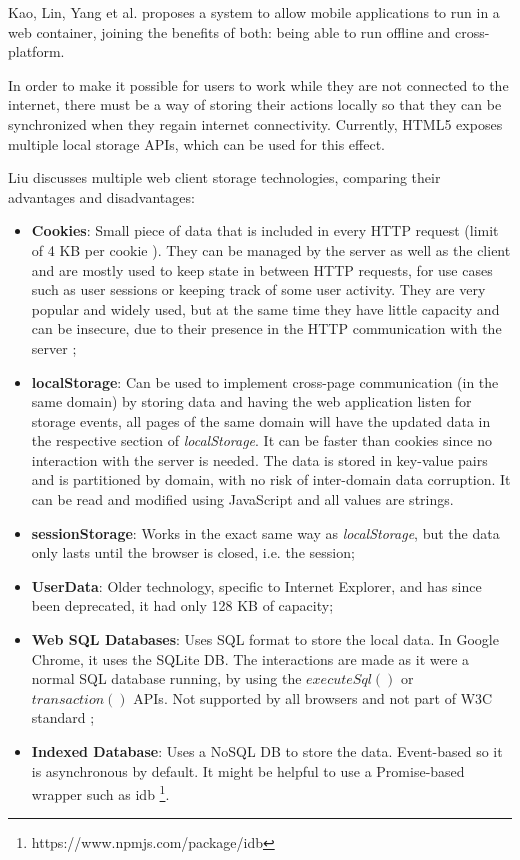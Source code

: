 Kao, Lin, Yang et al. \cite{Kao2012} proposes a system to allow mobile applications to run in a web container, joining the benefits of both: being able to run offline and cross-platform.

In order to make it possible for users to work while they are not connected to the internet, there must be a way of storing their actions locally so that they can be synchronized when they regain internet connectivity. Currently, HTML5 exposes multiple local storage APIs, which can be used for this effect.

Liu \cite{Liu2014} discusses multiple web client storage technologies, comparing their advantages and disadvantages:
\begin{itemize}
    \item \textbf{Cookies}: Small piece of data that is included in every HTTP request (limit of 4 KB per cookie \cite{cookies-rfc}). They can be managed by the server as well as the client and are mostly used to keep state in between HTTP requests, for use cases such as user sessions or keeping track of some user activity. They are very popular and widely used, but at the same time they have little capacity and can be insecure, due to their presence in the HTTP communication with the server \cite{Velagapudi2019} \cite{Kwon2020};
    \item \textbf{localStorage}: Can be used to implement cross-page communication (in the same domain) by storing data and having the web application listen for storage events, all pages of the same domain will have the updated data in the respective section of \textit{localStorage}. It can be faster than cookies since no interaction with the server is needed.
    The data is stored in key-value pairs and is partitioned by domain, with no risk of inter-domain data corruption. It can be read and modified using JavaScript and all values are strings.
    \item \textbf{sessionStorage}: Works in the exact same way as \textit{localStorage}, but the data only lasts until the browser is closed, i.e. the session;
    \item \textbf{UserData}: Older technology, specific to Internet Explorer, and has since been deprecated, it had only 128 KB of capacity;
    \item \textbf{Web SQL Databases}: Uses SQL format to store the local data. In Google Chrome, it uses the SQLite DB. The interactions are made as it were a normal SQL database running, by using the $executeSql()$ or $transaction()$ APIs. Not supported by all browsers and not part of W3C standard \cite{WebSQL-storage-w3c};
    \item \textbf{Indexed Database}: Uses a NoSQL DB to store the data. Event-based so it is asynchronous by default. It might be helpful to use a Promise-based wrapper \cite{promises-js-mdn} such as idb \footnote{https://www.npmjs.com/package/idb}.
\end{itemize}
